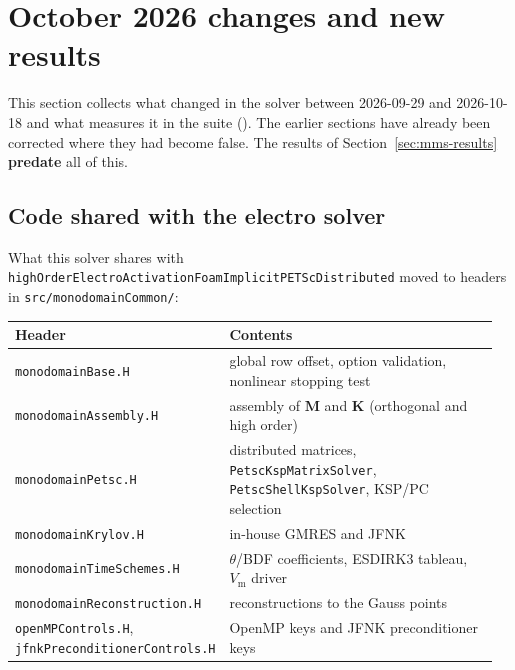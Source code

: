 \documentclass[11pt,a4paper]{article}
\newcommand{\code}[1]{\texttt{\small #1}}
\newcommand{\Vm}{V_{\text{m}}}
\newcommand{\Mmass}{\mathbf{M}}
\newcommand{\Kstif}{\mathbf{K}}
\begin{document}
\section{October 2026 changes and new results}
\label{sec:oct2026}

This section collects what changed in the solver between 2026-09-29 and
2026-10-18 and what measures it in the suite
(). The earlier sections
have already been corrected where they had become false. The results of
Section~\ref{sec:mms-results} \textbf{predate} all of this.

\subsection{Code shared with the electro solver}

What this solver shares with \code{highOrderElectroActivationFoamImplicitPETScDistributed}
moved to headers in \code{src/monodomainCommon/}:

\begin{center}
\begin{tabular}{@{}p{0.40\linewidth}p{0.56\linewidth}@{}}
\toprule
Header & Contents \\
\midrule
\code{monodomainBase.H} & global row offset, option validation, nonlinear stopping test \\
\code{monodomainAssembly.H} & assembly of $\Mmass$ and $\Kstif$ (orthogonal and high order) \\
\code{monodomainPetsc.H} & distributed matrices, \code{PetscKspMatrixSolver}, \code{PetscShellKspSolver}, KSP/PC selection \\
\code{monodomainKrylov.H} & in-house GMRES and JFNK \\
\code{monodomainTimeSchemes.H} & $\theta$/BDF coefficients, ESDIRK3 tableau, $\Vm$ driver \\
\code{monodomainReconstruction.H} & reconstructions to the Gauss points \\
\code{openMPControls.H}, \code{jfnkPreconditionerControls.H} & OpenMP keys and JFNK preconditioner keys \\
\bottomrule
\end{tabular}
\end{center}
\end{document}

